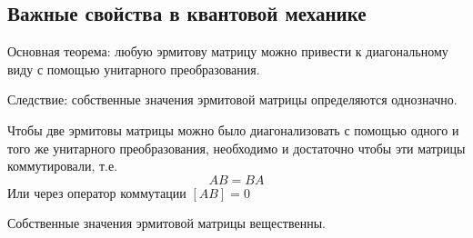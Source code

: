 \documentclass[a4paper,12pt]{article}
\begin{document}
\subsection{Важные свойства в квантовой механике}
Основная теорема: любую эрмитову матрицу можно привести к диагональному виду с помощью унитарного преобразования.\par
Следствие: собственные значения эрмитовой матрицы определяются однозначно.\par
Чтобы две эрмитовы матрицы можно было диагонализовать с помощью одного и того же унитарного преобразования, необходимо и достаточно чтобы эти матрицы коммутировали, т.е.
\begin{equation}
AB=BA
\end{equation}
Или через оператор коммутации $[AB]=0$ \par
Собственные значения эрмитовой матрицы вещественны.
\end{document}
